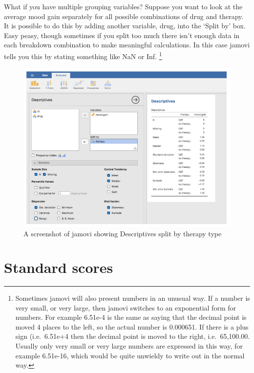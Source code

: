 \documentclass[
]{book}
\begin{document}
What if you have multiple grouping variables? Suppose you want to look at the average mood gain separately for all possible combinations of drug and therapy. It is possible to do this by adding another variable, drug, into the `Split by' box. Easy peasy, though sometimes if you split too much there isn't enough data in each breakdown combination to make meaningful calculations. In this case jamovi tells you this by stating something like NaN or Inf. \footnote{Sometimes jamovi will also present numbers in an unusual way. If a number is very small, or very large, then jamovi switches to an exponential form for numbers. For example 6.51e-4 is the same as saying that the decimal point is moved 4 places to the left, so the actual number is 0.000651. If there is a plus sign (i.e.~6.51e+4 then the decimal point is moved to the right, i.e.~65,100.00. Usually only very small or very large numbers are expressed in this way, for example 6.51e-16, which would be quite unwieldy to write out in the normal way.}

\begin{figure}
\includegraphics[width=0.9\linewidth]{images/Figure21} \caption{A screenshot of jamovi showing Descriptives split by therapy type}\label{fig:fig4-14}
\end{figure}

\hypertarget{standard-scores}{%
\section{Standard scores}\label{standard-scores}}
\end{document}
